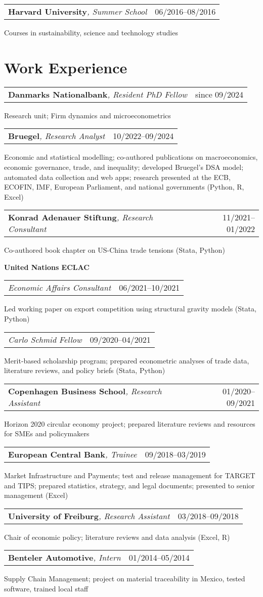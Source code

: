 \documentclass[a4paper,11pt]{article}
\makeatletter
\newcommand{\Subheading}[4]{   
    \vspace{7pt}
    \begin{tabular*}{\textwidth}[t]{@{}l@{\extracolsep{\fill}}r@{}}
        \textbf{#1}\textit{\small #2} & {\footnotesize #3} \\
    \end{tabular*}
    {\small #4}
}
\newcommand{\InstitutionHeading}[1]{%
    \vspace{7pt}
    \textbf{#1}
}
\newcommand{\SubSubheadingA}[3]{   
    \begin{tabular*}{\textwidth}[t]{@{}l@{\extracolsep{\fill}}r@{}}
        \textit{\small #1} & {\footnotesize #2} \\
    \end{tabular*}
    {\small #3}
}
\newcommand{\SubSubheadingB}[3]{   
    \vspace{3pt}
    \begin{tabular*}{\textwidth}[t]{@{}l@{\extracolsep{\fill}}r@{}}
        \textit{\small #1} & {\footnotesize #2} \\
    \end{tabular*}
    {\small #3}
}
\makeatother
\begin{document}
\Subheading
    {Harvard University}{, Summer School}{06/2016--08/2016}
    {Courses in sustainability, science and technology studies}

\section{Work Experience}

\Subheading
    {Danmarks Nationalbank}{, Resident PhD Fellow}{since 09/2024}
    {Research unit; Firm dynamics and microeconometrics}

\Subheading
    {Bruegel}{, Research Analyst}{10/2022--09/2024}
    {Economic and statistical modelling; co-authored publications on macroeconomics, 
    economic governance, trade, and inequality; 
    developed Bruegel's DSA model; 
    automated data collection and web apps;
    research presented at the ECB, ECOFIN, IMF, European Parliament, and national governments 
    (Python, R, Excel)}

\Subheading
    {Konrad Adenauer Stiftung}{, Research Consultant}{11/2021--01/2022}
    {Co-authored book chapter on US-China trade tensions 
    (Stata, Python)}  

    \InstitutionHeading{United Nations ECLAC}

        \SubSubheadingA{Economic Affairs Consultant}{06/2021--10/2021}
        {Led working paper on export competition using structural gravity models (Stata, Python)}
    
        \SubSubheadingB{Carlo Schmid Fellow}{09/2020--04/2021}
        {Merit-based scholarship program; prepared econometric analyses of trade data, 
        literature reviews, and policy briefs (Stata, Python)}

\Subheading
    {Copenhagen Business School}{, Research Assistant}{01/2020--09/2021}
    {Horizon 2020 circular economy project; prepared literature reviews and 
    resources for SMEs and policymakers}

\Subheading
    {European Central Bank}{, Trainee}{09/2018--03/2019}
    {Market Infrastructure and Payments; test and release management for TARGET 
    and TIPS; prepared statistics, strategy, and legal documents;
    presented to senior management (Excel)}

\Subheading
    {University of Freiburg}{, Research Assistant}{03/2018--09/2018}
    {Chair of economic policy; literature reviews and data analysis (Excel, R)}

\Subheading
    {Benteler Automotive}{, Intern}{01/2014--05/2014}
    {Supply Chain Management; project on material traceability in Mexico, 
    tested software, trained local staff}
\end{document}

